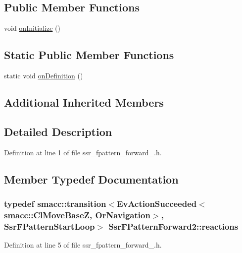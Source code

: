 \subsection*{Public Member Functions}
\begin{DoxyCompactItemize}
\item 
void \hyperlink{structSsrFPatternForward2_a81c19ada428b305cef1e21f39a090fa8}{on\+Initialize} ()
\end{DoxyCompactItemize}
\subsection*{Static Public Member Functions}
\begin{DoxyCompactItemize}
\item 
static void \hyperlink{structSsrFPatternForward2_a631add10c8ff5c96d45d54bdc5d918fc}{on\+Definition} ()
\end{DoxyCompactItemize}
\subsection*{Additional Inherited Members}


\subsection{Detailed Description}


Definition at line 1 of file ssr\+\_\+fpattern\+\_\+forward\+\_.\+h.



\subsection{Member Typedef Documentation}
\subsubsection[{\texorpdfstring{reactions}{reactions}}]{\setlength{\rightskip}{0pt plus 5cm}typedef {\bf smacc\+::transition}$<$Ev\+Action\+Succeeded$<${\bf smacc\+::\+Cl\+Move\+BaseZ}, Or\+Navigation$>$, {\bf Ssr\+F\+Pattern\+Start\+Loop}$>$ {\bf Ssr\+F\+Pattern\+Forward2\+::reactions}}\hypertarget{structSsrFPatternForward2_adc3056f3a7551d387d3c1b8dae279e3b}{}\label{structSsrFPatternForward2_adc3056f3a7551d387d3c1b8dae279e3b}


Definition at line 5 of file ssr\+\_\+fpattern\+\_\+forward\+\_.\+h.



